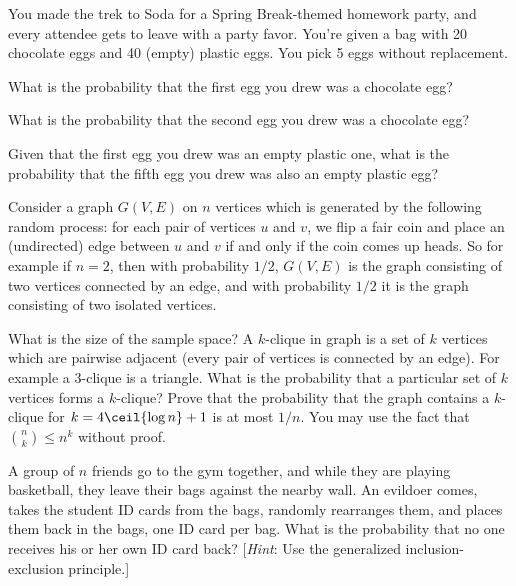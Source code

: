 
You made the trek to Soda for a Spring Break-themed homework party, and every attendee gets to leave with a party favor. You're given a bag with 20 chocolate eggs and 40 (empty) plastic eggs. You pick 5 eggs without replacement.

\begin{Parts}

\Part What is the probability that the first egg you drew was a chocolate egg?
\nosolspace{1cm}

\Part What is the probability that the second egg you drew was a chocolate egg? 
\nosolspace{1cm}

\Part Given that the first egg you drew was an empty plastic one, what is the probability that the fifth egg you drew was also an empty plastic egg?
\nosolspace{1cm}

\end{Parts}



Consider a graph $G(V,E)$ on $n$ vertices which is generated by the following random process: for each pair of vertices $u$ and $v$, we flip a fair coin and place an (undirected) edge between $u$ and $v$ if and only if the coin comes up heads. So for example if $n = 2$, then with probability $1/2$, $G(V,E)$ is the graph consisting of two vertices connected by an edge, and with probability $1/2$ it is the graph consisting of two isolated vertices.

\begin{Parts}
\Part What is the size of the sample space?
\Part A $k$-clique in graph is a set of $k$ vertices which are pairwise adjacent (every pair of vertices is connected by an edge). For example a $3$-clique is a triangle. What is the probability that a particular
set of $k$ vertices forms a $k$-clique? 
\Part Prove that the probability that the graph contains a $k$-clique for $k = 4\ceil{\log n}+1$ is at most
$1/n$. You may use the fact that ${ n \choose k } \le n^k $ without proof.
\end{Parts}


A group of $n$ friends go to the gym together, and while they are playing basketball, they leave their bags against the nearby wall.
An evildoer comes, takes the student ID cards from the bags, randomly rearranges them, and places them back in the bags, one ID card per bag.
What is the probability that no one receives his or her own ID card back?
[\textit{Hint}: Use the generalized inclusion-exclusion principle.]

